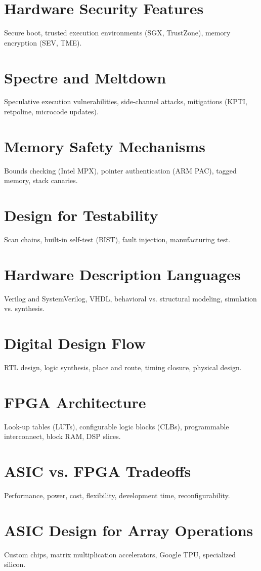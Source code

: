 \chapter{Hardware Security Features}
Secure boot, trusted execution environments (SGX, TrustZone), memory encryption (SEV, TME).

\chapter{Spectre and Meltdown}
Speculative execution vulnerabilities, side-channel attacks, mitigations (KPTI, retpoline, microcode updates).

\chapter{Memory Safety Mechanisms}
Bounds checking (Intel MPX), pointer authentication (ARM PAC), tagged memory, stack canaries.

\chapter{Design for Testability}
Scan chains, built-in self-test (BIST), fault injection, manufacturing test.

\chapter{Hardware Description Languages}
Verilog and SystemVerilog, VHDL, behavioral vs. structural modeling, simulation vs. synthesis.

\chapter{Digital Design Flow}
RTL design, logic synthesis, place and route, timing closure, physical design.

\chapter{FPGA Architecture}
Look-up tables (LUTs), configurable logic blocks (CLBs), programmable interconnect, block RAM, DSP slices.

\chapter{ASIC vs. FPGA Tradeoffs}
Performance, power, cost, flexibility, development time, reconfigurability.

\chapter{ASIC Design for Array Operations}
Custom chips, matrix multiplication accelerators, Google TPU, specialized silicon.